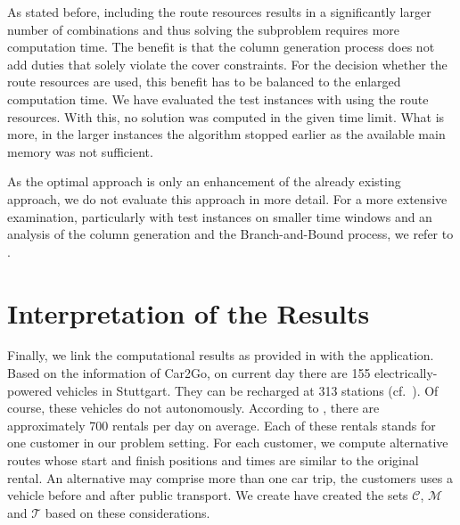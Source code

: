 As stated before, including the route resources results in a significantly larger number of combinations and thus solving the subproblem requires more computation time. The benefit is that the column generation process does not add duties that solely violate the cover constraints. For the decision whether the route resources are used, this benefit has to be balanced to the enlarged computation time. We have evaluated the test instances with using the route resources. With this, no solution was computed in the given time limit. What is more, in the larger instances the algorithm stopped earlier as the available main memory was not sufficient.

As the optimal approach is only an enhancement of the already existing approach, we do not evaluate this approach in more detail. For a more extensive examination, particularly with test instances on smaller time windows and an analysis of the column generation and the Branch-and-Bound process, we refer to \cite[Sec.~10.2]{Kaiser}.


\section{Interpretation of the Results}

Finally, we link the computational results as provided in  with the application. Based on the information of Car2Go, on current day there are 155 electrically-powered vehicles in Stuttgart. They can be recharged at 313 stations (cf.~\cite[p.~144]{Kaiser}). Of course, these vehicles do not autonomously. According to , there are approximately 700 rentals per day on average. Each of these rentals stands for one customer in our problem setting. For each customer, we compute alternative routes whose start and finish positions and times are similar to the original rental. An alternative may comprise more than one car trip, \ie the customers uses a vehicle before and after public transport. We create have created the sets $\mathcal{C}$, $\mathcal{M}$ and $\mathcal{T}$ based on these considerations.

